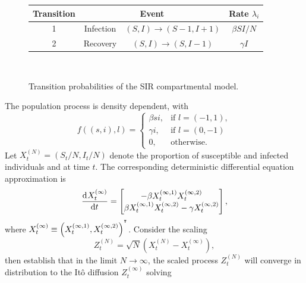 \usetikzlibrary{automata,positioning,arrows}
\tikzset{->, node distance = 2cm}
\begin{figure}
	\begin{center}
		\begin{tabular}{|c|c|c|c|}
			\hline
			Transition & \multicolumn{2}{c|}{Event} & Rate \(\lambda_i\)                                                    \\ \hline
			1          & Infection                  & \(\left(S, I\right) \to \left(S-1, I + 1\right)\) & \(\beta S I / N\) \\ \hline
			2          & Recovery                   & \(\left(S,I\right) \to \left(S, I - 1\right)\)    & \(\gamma I\)      \\ \hline
		\end{tabular} \\
		\caption{Transition probabilities of the SIR compartmental model.}
		\label{fig:sir_transition}
	\end{center}
\end{figure}
The population process is density dependent, with
\[
	f\left((s,i), l\right) = \begin{cases}
		\beta s i, & \text{if } l = \left(-1, 1\right), \\
		\gamma i,  & \text{if } l = \left(0,-1\right)   \\
		0,         & \text{otherwise}.
	\end{cases}
\]
Let \(X_t^{(N)} = \left(S_t / N, I_t / N\right)\) denote the proportion of susceptible and infected individuals and at time \(t\).
The corresponding deterministic differential equation approximation is
\[
	\dod{X_t^{(\infty)}}{t} = \begin{bmatrix}
		-\beta X_t^{(\infty,1)} X_t^{(\infty, 2)} \\
		\beta X_t^{(\infty,1)} X_t^{(\infty, 2)} -\gamma X_t^{(\infty, 2)}
	\end{bmatrix},
\]
where \(X_t^{(\infty)} \equiv \left(X_t^{(\infty, 1)}, X_t^{(\infty, 2)}\right)^{^{\intercal}}\).
Consider the scaling
\[
	Z_t^{(N)} = \sqrt{N}\left(X_t^{(N)} - X_t^{(\infty)}\right),
\]
then \citet{Kurtz_1971_LimitTheoremsSequences} establish that in the limit \(N \to \infty\), the scaled process \(Z_t^{(N)}\) will converge in distribution to the It\^o diffusion \(Z_t^{(\infty)}\) solving
